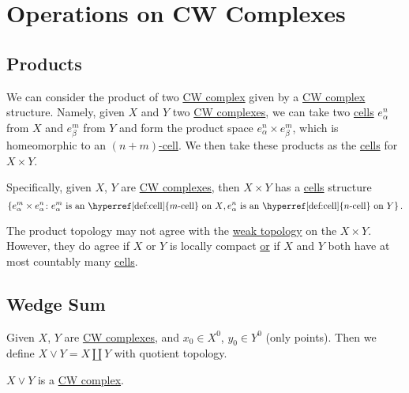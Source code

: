 \section{Operations on CW Complexes}
\subsection{Products}\label{CW-complex-product}
We can consider the product of two \hyperref[def:CW-Complex]{CW complex} given by a \hyperref[def:CW-Complex]{CW complex} structure. Namely, given \(X\) and \(Y\)
two \hyperref[def:CW-Complex]{CW complexes}, we can take two \hyperref[def:cell]{cells} \(e^n_{\alpha }\) from \(X\) and \(e^m_{\beta }\) from \(Y\) and
form the product space \(e^n_{\alpha }\times e^m_{\beta }\), which is homeomorphic to an \hyperref[def:cell]{\((n+m)\)-cell}. We then
take these products as the \hyperref[def:cell]{cells} for \(X\times Y\).

Specifically, given \(X\), \(Y\) are \hyperref[def:CW-Complex]{CW complexes}, then \(X\times Y\) has a \hyperref[def:cell]{cells} structure
\[
	\left\{e_{\alpha}^m \times e_{\alpha}^n\colon e^m_{\alpha}\text{ is an \hyperref[def:cell]{\(m\)-cell} on \(X\)}, e^n_{\alpha}\text{ is an \hyperref[def:cell]{\(n\)-cell} on \(Y\)}\right\}.
\]
\begin{remark}
	The product topology may not agree with the \hyperref[def:weak-topology]{weak topology} on the \(X\times Y\). However, they do agree if
	\(X\) or \(Y\) is locally compact \underline{or} if \(X\) and \(Y\) both have at most countably many \hyperref[def:cell]{cells}.
\end{remark}

\subsection{Wedge Sum}\label{CW-complex-wedge-sum}
Given \(X\), \(Y\) are \hyperref[def:CW-Complex]{CW complexes}, and \(x_0\in X^0\), \(y_0\in Y^0\) (only points). Then we define \(X\vee Y = X\coprod Y\)
with quotient topology.
\begin{remark}
	\(X\lor Y\) is a \hyperref[def:CW-Complex]{CW complex}.
\end{remark}

